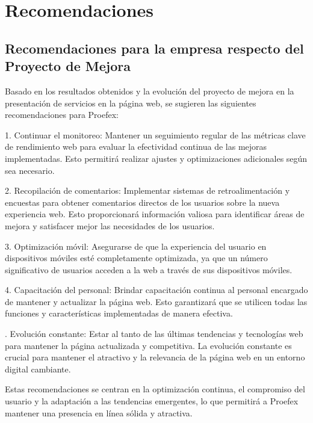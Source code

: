 \titlespacing{\chapter}{0pt}{120pt}{7pt}
\chapter{Recomendaciones}
\label{cap:recomendar}

\section{Recomendaciones para la empresa respecto del Proyecto de Mejora}

Basado en los resultados obtenidos y la evolución del proyecto de mejora en la presentación de servicios en la página web, se sugieren las siguientes recomendaciones para Proefex:

1. Continuar el monitoreo: Mantener un seguimiento regular de las métricas clave de rendimiento web para evaluar la efectividad continua de las mejoras implementadas. Esto permitirá realizar ajustes y optimizaciones adicionales según sea necesario.

2. Recopilación de comentarios: Implementar sistemas de retroalimentación y encuestas para obtener comentarios directos de los usuarios sobre la nueva experiencia web. Esto proporcionará información valiosa para identificar áreas de mejora y satisfacer mejor las necesidades de los usuarios.

3. Optimización móvil: Asegurarse de que la experiencia del usuario en dispositivos móviles esté completamente optimizada, ya que un número significativo de usuarios acceden a la web a través de sus dispositivos móviles.

4. Capacitación del personal: Brindar capacitación continua al personal encargado de mantener y actualizar la página web. Esto garantizará que se utilicen todas las funciones y características implementadas de manera efectiva.

. Evolución constante: Estar al tanto de las últimas tendencias y tecnologías web para mantener la página actualizada y competitiva. La evolución constante es crucial para mantener el atractivo y la relevancia de la página web en un entorno digital cambiante.

Estas recomendaciones se centran en la optimización continua, el compromiso del usuario y la adaptación a las tendencias emergentes, lo que permitirá a Proefex mantener una presencia en línea sólida y atractiva.


